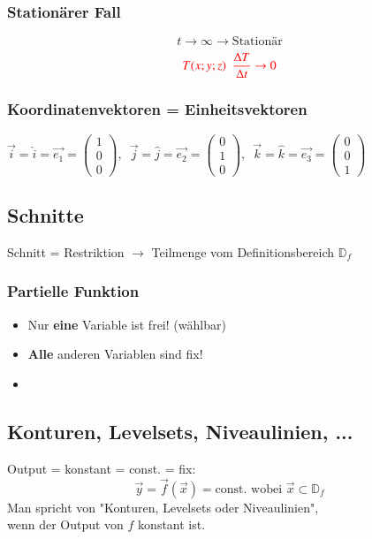 \subsubsection{Stationärer Fall}
$${t \rightarrow \infty \rightarrow \text{Stationär}}$$
$${{\color{red}T(x;y;z) \enspace\frac{\Delta{T}}{\Delta{t}} \rightarrow 0 }}$$


\subsubsection{Koordinatenvektoren = Einheitsvektoren}
$\vec{i}=\hat{i}=\vec{{e}_1}=
\begin{pmatrix}
    1 \\
    0 \\
    0
\end{pmatrix},\enspace
\vec{j}=\hat{j}=\vec{{e}_2}=
\begin{pmatrix}
    0 \\
    1 \\
    0
\end{pmatrix},\enspace
\vec{k}=\hat{k}=\vec{{e}_3}=
\begin{pmatrix}
    0 \\
    0 \\
    1
\end{pmatrix}$


\subsection{Schnitte}
Schnitt = Restriktion $\rightarrow$ Teilmenge vom Definitionsbereich ${\mathbb{D}_f}$


\subsubsection{Partielle Funktion}

\begin{itemize}
    \item Nur \textbf{eine} Variable ist frei! (wählbar)
    \item \textbf{Alle} anderen Variablen sind fix!
    \item[] 
\end{itemize}


\subsection{Konturen, Levelsets, Niveaulinien, ...}
Output = konstant = const. = fix: 
$$\vec{y} = \vec{f}(\vec{x}) = \text{const. wobei } \vec{x} \subset \mathbb{D}_f$$
Man spricht von "Konturen, Levelsets oder Niveaulinien",\\
wenn der Output von ${f}$ konstant ist.\\

